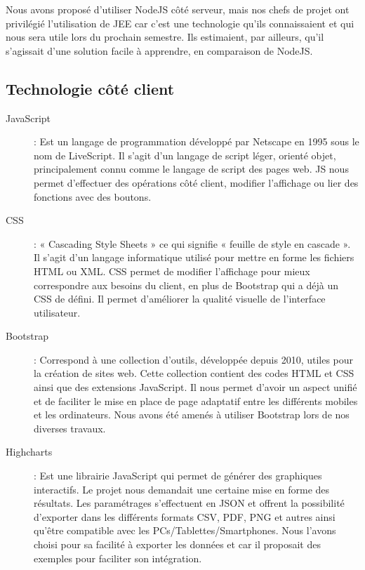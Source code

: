Nous avons proposé d'utiliser NodeJS côté serveur, mais nos chefs de projet ont privilégié l'utilisation de JEE car c'est une technologie qu'ils connaissaient et qui nous sera utile lors du prochain semestre. Ils estimaient, par ailleurs, qu'il s'agissait d'une solution facile à apprendre, en comparaison de NodeJS. 

\subsection{Technologie côté client}

\begin{description}

\item[JavaScript] : Est un langage de programmation développé par Netscape en 1995 sous le nom de LiveScript. Il s'agit d'un langage de script léger, orienté objet, principalement connu comme le langage de script des pages web. 
JS nous permet d'effectuer des opérations côté client, modifier l'affichage ou lier des fonctions avec des boutons.\

\item[CSS] : « Cascading Style Sheets » ce qui signifie « feuille de style en cascade ». 
Il s'agit d'un langage informatique utilisé pour mettre en forme les fichiers HTML ou XML. 
CSS permet de modifier l'affichage pour mieux correspondre aux besoins du client, en plus de Bootstrap qui a déjà un CSS de défini. Il permet d'améliorer la qualité visuelle de l'interface utilisateur. \

\item[Bootstrap] : Correspond à une collection d'outils, développée depuis 2010, utiles pour la création de sites web. Cette collection contient des codes HTML et CSS ainsi que des extensions JavaScript. 
Il nous permet d'avoir un aspect unifié et de faciliter le mise en place de page adaptatif entre les différents mobiles et les ordinateurs. Nous avons été amenés à utiliser Bootstrap lors de nos diverses travaux.  \

\item[Highcharts] : Est une librairie JavaScript qui permet de générer des graphiques interactifs. Le projet nous demandait une certaine mise en forme des résultats. Les paramétrages s'effectuent en JSON et offrent la possibilité d'exporter dans les différents formats CSV, PDF, PNG et autres ainsi qu'être compatible avec les PCs/Tablettes/Smartphones.
Nous l'avons choisi pour sa facilité à exporter les données et car il proposait des exemples pour faciliter son intégration.

\end{description}

